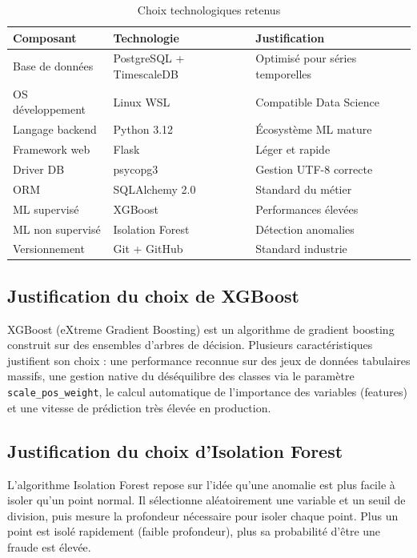 \documentclass[12pt, oneside, a4paper]{report}
\begin{document}
\begin{table}[H]
\centering
\caption{Choix technologiques retenus}
\label{tab:choix-tech}
\vspace{0.5cm}
\small
\renewcommand{\arraystretch}{1.3}
\begin{tabular}{|l|l|p{5cm}|}
\hline
\textbf{Composant} & \textbf{Technologie} & \textbf{Justification} \\
\hline
Base de données & PostgreSQL + TimescaleDB & Optimisé pour séries temporelles \\
\hline
OS développement & Linux WSL & Compatible Data Science \\
\hline
Langage backend & Python 3.12 & Écosystème ML mature \\
\hline
Framework web & Flask & Léger et rapide \\
\hline
Driver DB & psycopg3 & Gestion UTF-8 correcte \\
\hline
ORM & SQLAlchemy 2.0 & Standard du métier \\
\hline
ML supervisé & XGBoost & Performances élevées \\
\hline
ML non supervisé & Isolation Forest & Détection anomalies \\
\hline
Versionnement & Git + GitHub & Standard industrie \\
\hline
\end{tabular}
\end{table}


\subsection{Justification du choix de XGBoost}
XGBoost (eXtreme Gradient Boosting) est un algorithme de gradient boosting construit sur des ensembles d’arbres de décision. Plusieurs caractéristiques justifient son choix : une performance reconnue sur des jeux de données tabulaires massifs, une gestion native du déséquilibre des classes via le paramètre \texttt{scale\_pos\_weight}, le calcul automatique de l’importance des variables (features) et une vitesse de prédiction très élevée en production.

\subsection{Justification du choix d'Isolation Forest}
L’algorithme Isolation Forest repose sur l’idée qu’une anomalie est plus facile à isoler qu’un point normal. Il sélectionne aléatoirement une variable et un seuil de division, puis mesure la profondeur nécessaire pour isoler chaque point. Plus un point est isolé rapidement (faible profondeur), plus sa probabilité d'être une fraude est élevée.
\end{document}
